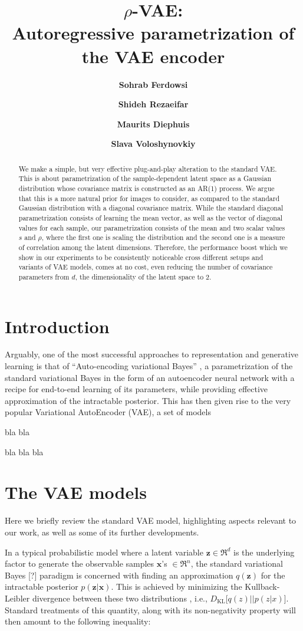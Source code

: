 \documentclass{article}
\title{$\rho$-VAE: \\Autoregressive parametrization of the VAE encoder}
\author{\textbf{Sohrab Ferdowsi}}
\author{\textbf{Shideh Rezaeifar}}
\author{\textbf{Maurits Diephuis}}
\author{\textbf{Slava Voloshynovkiy}}
\affil{
Department of Computer Science, University of Geneva, Switzerland \authorcr
  \{\tt sohrab.ferdowsi, shideh.rezaeifar, maurits.diephuis, svolos\}@unige.ch}
\begin{document}
\maketitle

\begin{abstract}
We make a simple, but very effective plug-and-play alteration to the standard VAE. This is about parametrization of the sample-dependent latent space as a Gaussian distribution whose covariance matrix is constructed as an AR(1) process. We argue that this is a more natural prior for images to consider, as compared to the standard Gaussian distribution with a diagonal covariance matrix. While the standard diagonal parametrization consists of learning the mean vector, as well as the vector of diagonal values for each sample, our parametrization consists of the mean and two scalar values $s$ and $\rho$, where the first one is scaling the distribution and the second one is a measure of correlation among the latent dimensions. Therefore, the performance boost which we show in our experiments to be consistently noticeable cross different setups and variants of VAE models, comes at no cost, even reducing the number of covariance parameters from $d$, the dimensionality of the latent space to $2$.

\end{abstract}

\section{Introduction}
Arguably, one of the most successful approaches to representation and generative learning is that of ``Auto-encoding variational Bayes'' \cite{VAE}, a parametrization of the standard variational Bayes in the form of an autoencoder neural network with a recipe for end-to-end learning of its parameters, while providing effective approximation of the intractable posterior. This has then given rise to the very popular Variational AutoEncoder (VAE), a set of models

bla bla

bla bla bla


\section{The VAE models} \label{sec:VAE}
Here we briefly review the standard VAE model, highlighting aspects relevant to our work, as well as some of its further developments.

In a typical probabilistic model where a latent variable $\mathbf{z} \in \Re^d$ is the underlying factor to generate the observable samples $\mathbf{x}$'s $\in \Re^n$, the standard variational Bayes [?] paradigm is concerned with finding an approximation $q(\mathbf{z})$ for the intractable posterior $p(\mathbf{z}|\mathbf{x})$. This is achieved by minimizing the Kullback-Leibler divergence between these two distributions , i.e., $D_{\text{KL}}\Big[ q(z) || p(z|x) \Big]$. Standard treatments of this quantity, along with its non-negativity property will then amount to the following inequality:
\end{document}
